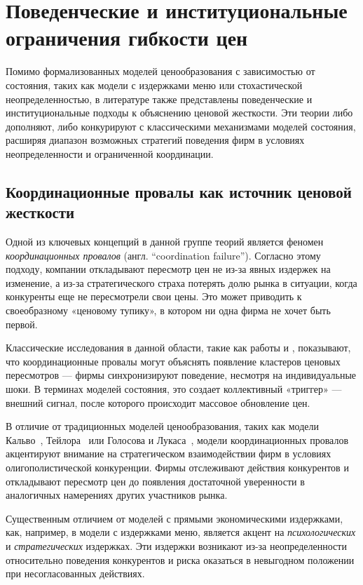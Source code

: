 \section{Поведенческие и институциональные ограничения гибкости цен}\label{sec:ch1/sec2}

Помимо формализованных моделей ценообразования с зависимостью от состояния, таких как модели с издержками меню или стохастической неопределенностью, в литературе также представлены поведенческие и институциональные подходы к объяснению ценовой жесткости. Эти теории либо дополняют, либо конкурируют с классическими механизмами моделей состояния, расширяя диапазон возможных стратегий поведения фирм в условиях неопределенности и ограниченной координации.

\subsection{Координационные провалы как источник ценовой жесткости}\label{subsec:ch1/sec2/sub1}

Одной из ключевых концепций в данной группе теорий является феномен \textit{координационных провалов} (англ. ``coordination failure''). Согласно этому подходу, компании откладывают пересмотр цен не из-за явных издержек на изменение, а из-за стратегического страха потерять долю рынка в ситуации, когда конкуренты еще не пересмотрели свои цены. Это может приводить к своеобразному «ценовому тупику», в котором ни одна фирма не хочет быть первой.

Классические исследования в данной области, такие как работы \cite{BallRomer1987} и \cite{CooperJohn1988}, показывают, что координационные провалы могут объяснять появление кластеров ценовых пересмотров — фирмы синхронизируют поведение, несмотря на индивидуальные шоки. В терминах моделей состояния, это создает коллективный «триггер» — внешний сигнал, после которого происходит массовое обновление цен.

В отличие от традиционных моделей ценообразования, таких как модели Кальво~\cite{Calvo1983}, Тейлора~\cite{Taylor1980} или Голосова и Лукаса~\cite{golosov2007}, модели координационных провалов акцентируют внимание на стратегическом взаимодействии фирм в условиях олигополистической конкуренции. Фирмы отслеживают действия конкурентов и откладывают пересмотр цен до появления достаточной уверенности в аналогичных намерениях других участников рынка.

Существенным отличием от моделей с прямыми экономическими издержками, как, например, в модели с издержками меню, является акцент на \textit{психологических} и \textit{стратегических} издержках. Эти издержки возникают из-за неопределенности относительно поведения конкурентов и риска оказаться в невыгодном положении при несогласованных действиях.

